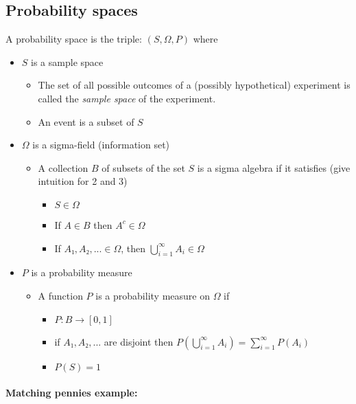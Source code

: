 \subsection{Probability spaces}

     A probability space is the triple: $(S, \Omega, P)$ where
\begin{itemize}
\item $S$ is a sample space
\begin{itemize}
\item The set of all possible outcomes of a (possibly hypothetical)
         experiment is called the \emph{sample space} of the experiment.
\item An event is a subset of $S$
\end{itemize}
\item $\Omega$ is a sigma-field (information set)
\begin{itemize}
\item A collection $B$ of subsets of the set $S$ is a sigma
         algebra if it satisfies (give intuition for 2 and 3)
\begin{itemize}
\item $S ∈  \Omega$
\item If $A ∈  B$ then $A^c ∈  \Omega$
\item If $A₁, A₂, ... ∈  \Omega$, then $\bigcup_{i=1}^∞ A_i
           ∈  \Omega$
\end{itemize}
\end{itemize}
\item $P$ is a probability measure
\begin{itemize}
\item A function $P$ is a probability measure on $\Omega$ if
\begin{itemize}
\item $P:  B → [0,1]$
\item if $A₁,A₂,...$ are disjoint then $P(\bigcup_{i=1}^∞
           A_i) = ∑_{i=1}^∞ P(A_i)$
\item $P(S) = 1$
\end{itemize}
\end{itemize}
\end{itemize}

\paragraph{Matching pennies example:}


